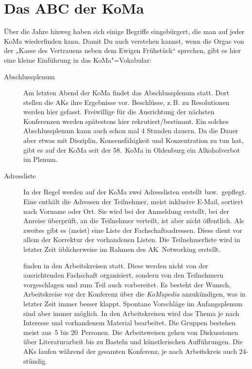 \chapter{Das ABC der KoMa}

Über die Jahre hinweg haben sich einige Begriffe eingebürgert, die man auf
jeder KoMa wiederfinden kann. Damit Du auch verstehen kannst, wenn die Orgas
von der „Kasse des Vertrauens neben dem Ewigen Frühstück“ sprechen, gibt es
hier eine kleine Einführung in das KoMa"=Vokabular:

\begin{description}
\item[Abschlussplenum] Am letzten Abend der KoMa findet das Abschlussplenum
	statt. Dort stellen die AKs ihre Ergebnisse vor. Beschlüsse, z.\,B. zu
	Resolutionen werden hier gefasst.  Freiwillige für die Ausrichtung der
	nächsten Konferenzen werden spätestens hier rekrutiert/bestimmt. Ein
	solches Abschlussplenum kann auch schon mal 4 Stunden dauern.  Da die
	Dauer aber etwas mit Disziplin, Konsensfähigkeit und Konzentration zu
	tun hat, gibt es auf der KoMa seit der 58.~KoMa in Oldenburg ein
	Alkoholverbot im Plenum.

\item[Adressliste] In der Regel werden auf der KoMa zwei Adresslisten erstellt
	bzw.\ gepflegt. Eine enthält die Adressen der Teilnehmer, meist inklusive
	E-Mail, sortiert nach Vorname oder Ort. Sie wird bei der Anmeldung
	erstellt, bei der Anreise überprüft, an die Teilnehmer verteilt, ist
	aber nicht öffentlich. Als zweites gibt es (meist) eine Liste der
	Fachschaftsadressen. Diese dient vor allem der Korrektur der
	vorhandenen Listen. Die Teilnehmerliste wird in letzter Zeit
	üblicherweise im Rahmen des AK~Networking erstellt.

	finden in den Arbeitskreisen statt. Diese werden nicht von der
	ausrichtenden Fachschaft organisiert, sondern von den Teilnehmern
	vorgeschlagen und zum Teil auch vorbereitet. Es besteht der Wunsch,
	Arbeitskreise vor der Konferenz über die \emph{KoMapedia} anzukündigen,
	was in letzter Zeit immer besser klappt. Spontane Vorschläge im
	Anfangsplenum sind aber immer möglich. In den Arbeitskreisen wird das
	Thema je nach Interesse und vorhandenem Material bearbeitet. Die
	Gruppen bestehen meist aus~5 bis 20~Personen. Die Arbeitsweisen gehen
	von Diskussionen über Literaturarbeit bis zu Basteln und künstlerischen
	Aufführungen. Die AKs laufen während der gesamten Konferenz, je nach
	Arbeitskreis auch 24-stündig.


\end{description}
